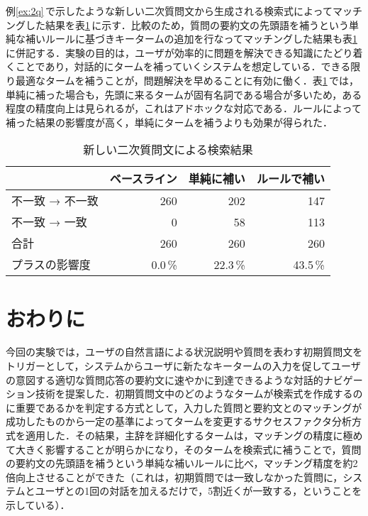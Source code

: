 例\ref{ex:2q}\,で示したような新しい二次質問文から生成される検索式によってマッチングした結果を表\ref{tab:new2q}\,に示す．比較のため，質問の要約文の先頭語を補うという単純な補いルールに基づきキータームの追加を行なってマッチングした結果も表\ref{tab:new2q}\,に併記する．実験の目的は，ユーザが効率的に問題を解決できる知識にたどり着くことであり，対話的にタームを補っていくシステムを想定している．できる限り最適なタームを補うことが，問題解決を早めることに有効に働く．表\ref{tab:new2q}\,では，単純に補った場合も，先頭に来るタームが固有名詞である場合が多いため，ある程度の精度向上は見られるが，これはアドホックな対応である．ルールによって補った結果の影響度が高く，単純にタームを補うよりも効果が得られた．

\begin{table}[ht]
 \caption{新しい二次質問文による検索結果}
 \label{tab:new2q}
 \begin{center}
  \begin{tabular}{|l|r|r|r|} \hline
   & ベースライン & 単純に補い & ルールで補い \\ \hline \hline
   不一致 → 不一致 & 260 & 202 & 147 \\ \hline
   不一致 → 一致 & 0 & 58 & 113 \\ \hline \hline
   合計 & 260 & 260 & 260 \\ \hline
   プラスの影響度 & 0.0\,\% & 22.3\,\% & 43.5\,\% \\ \hline
  \end{tabular}
 \end{center}
\end{table}

\section{おわりに}
今回の実験では，ユーザの自然言語による状況説明や質問を表わす初期質問文をトリガーとして，システムからユーザに新たなキータームの入力を促してユーザの意図する適切な質問応答の要約文に速やかに到達できるような対話的ナビゲーション技術を提案した．初期質問文中のどのようなタームが検索式を作成するのに重要であるかを判定する方式として，入力した質問と要約文とのマッチングが成功したものから一定の基準によってタームを変更するサクセスファクタ分析方式を適用した．その結果，主辞を詳細化するタームは，マッチングの精度に極めて大きく影響することが明らかになり，そのタームを検索式に補うことで，質問の要約文の先頭語を補うという単純な補いルールに比べ，マッチング精度を約2倍向上させることができた（これは，初期質問では一致しなかった質問に，システムとユーザとの1回の対話を加えるだけで，5割近くが一致する，ということを示している）．

